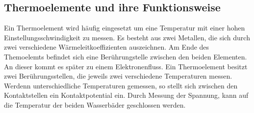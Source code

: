 \subsection{Thermoelemente und ihre Funktionsweise} %

Ein Thermoelement wird häufig eingesetzt um eine  
Temperatur mit einer hohen Einstellungsschwindigkeit zu messen.
Es besteht aus zwei Metallen, die sich durch zwei 
verschiedene Wärmeleitkoeffizienten auszeichnen.
Am Ende des Themoelemts befindet sich eine Berührungstelle zwischen 
den beiden Elementen.
An dieser kommt es später zu einem Elektronenfluss.
Ein Thermoelement besitzt zwei Berührungsstellen, die 
jeweils zwei verschiedene Temperaturen messen.
Werdenn unterschiedliche Temperaturen gemessen, so 
stellt sich zwischen den Kontaktstellen ein Kontaktpotential 
ein. 
Durch Messung der Spannung, kann auf die 
Temperatur der beiden Wasserbäder geschlossen werden.





